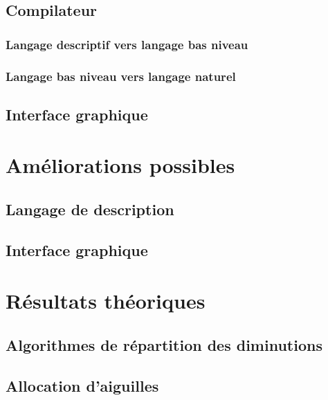 \documentclass{article}
\begin{document}
\subsection{Compilateur}

\subsubsection{Langage descriptif vers langage bas niveau}

\subsubsection{Langage bas niveau vers langage naturel}




\subsection{Interface graphique}





\section{Améliorations possibles}


\subsection{Langage de description}

\subsection{Interface graphique}




\section{Résultats théoriques}

\subsection{Algorithmes de répartition des diminutions}

\subsection{Allocation d'aiguilles}
\end{document}
